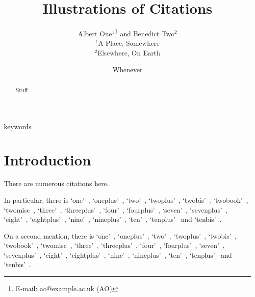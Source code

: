 \documentclass[useAMS,usenatbib]{mn2e}
\title[Illustrations of Citations]{Illustrations of Citations}
\author[Albert One and Benedict Two]{Albert One$^{1}$\thanks{E-mail:
ao@example.ac.uk (AO)} and Benedict Two$^{2}$\\
$^{1}$A Place, Somewhere\\
$^{2}$Elsewhere, On Earth}
\begin{document}
%
\makeatletter
\def\mniiiauthor#1#2#3{%
  \expandafter\ifx\csname mniiiauth@#1\endcsname\relax
    \global\expandafter\def\csname mniiiauth@#1\endcsname{X}#2%
  \else
    #3%
  \fi}
\makeatletter

\date{Whenever}

\pagerange{\pageref{firstpage}--\pageref{lastpage}} 

\maketitle

\label{firstpage}

\begin{abstract}
Stuff.
\end{abstract}

\begin{keywords}
keywords
\end{keywords}

\section{Introduction}

There are numerous citations here.

In particular, there is
`one'~\citep{one},
`oneplus'~\citep{oneplus},
`two'~\citep{two},
`twoplus'~\citep{twoplus},
`twobis'~\citep{twobis},
`twobook'~\citep{twobook},
`twomisc~\citep{twomisc},
`three'~\citep{three},
`threeplus'~\citep{threeplus},
`four'~\citep{four},
`fourplus'~\citep{fourplus},
`seven'~\citep{seven},
`sevenplus'~\citep{sevenplus},
`eight'~\citep{eight},
`eightplus'~\citep{eightplus},
`nine'~\citep{nine},
`nineplus'~\citep{nineplus},
`ten'~\citep{ten},
`tenplus'~\citep{tenplus} and
`tenbis'~\citep{tenbis}.

On a second mention, there is
`one'~\citep{one},
`oneplus'~\citep{oneplus},
`two'~\citep{two},
`twoplus'~\citep{twoplus},
`twobis'~\citep{twobis},
`twobook'~\citep{twobook},
`twomisc~\citep{twomisc},
`three'~\citep{three},
`threeplus'~\citep{threeplus},
`four'~\citep{four},
`fourplus'~\citep{fourplus},
`seven'~\citep{seven},
`sevenplus'~\citep{sevenplus},
`eight'~\citep{eight},
`eightplus'~\citep{eightplus},
`nine'~\citep{nine},
`nineplus'~\citep{nineplus},
`ten'~\citep{ten},
`tenplus'~\citep{tenplus} and
`tenbis'~\citep{tenbis}.





\bsp

\label{lastpage}
\end{document}
